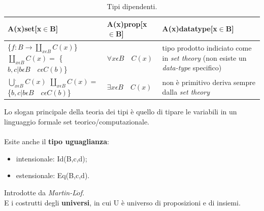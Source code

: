 \documentclass[10pt,a4paper, italian]{book}
\begin{document}
\begin{table}[H]
\centering
\begin{tabularx}{\textwidth}{p{3.8cm}XX}
\hline 
\rowcolor{orange}
{\color[HTML]{FFFFFF}\textbf{A(x)set[x$\in$B]}} & {\color[HTML]{FFFFFF} \textbf{A(x)prop[x$\in$B]}} & {\color[HTML]{FFFFFF}\textbf{A(x)datatype[x$\in$B]}}\\
\hline\hline
\centering \scriptsize{\{$\displaystyle f: B \rightarrow \displaystyle\coprod\limits_{x \epsilon B} C(x)$\}} \scriptsize{$\displaystyle\coprod\limits_{x \epsilon B} C(x) =$ \{$b,c | b\epsilon B \quad c\epsilon C(b)$\}}& \centering \small{$\displaystyle \forall {x \epsilon B} \quad C(x)$} & tipo prodotto indiciato come in \textit{set theory} (non esiste un \textit{data-type} specifico)\\
\hline
\centering \scriptsize{$\displaystyle\bigcup\limits_{x \epsilon B}^. C(x)$} \qquad \qquad \qquad \scriptsize{$\displaystyle\coprod\limits_{x \epsilon B} C(x) =$ \{$b,c | b\epsilon B \quad c\epsilon C(b)$\}} & \centering \small{$\displaystyle \exists{x \epsilon B} \quad C(x)$} & non \`e primitivo deriva sempre dalla \textit{set theory}\\
\end{tabularx}
\caption{\label{tab:tipi-dipendenti}Tipi dipendenti.} 
\end{table}
\noindent
Lo slogan principale della teoria dei tipi \`e quello di tipare le variabili in un linguaggio formale set teorico/computazionale.\\\\
Esite anche il \textbf{tipo uguaglianza}:
\begin{itemize}
\item intensionale: Id(B,c,d);
\item estensionale: Eq(B,c,d).
\end{itemize}
\noindent
Introdotte da \textit{Martin-L$\ddot{o}$f}.\\
E i costrutti degli \textbf{universi}, in cui U \`e universo di proposizioni e di insiemi.
\end{document}
